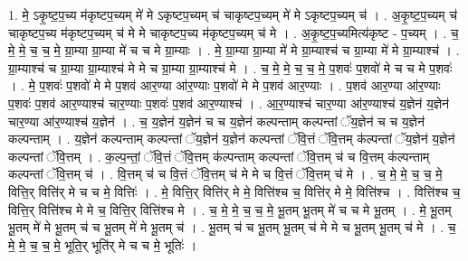 \documentclass[17pt]{extarticle}
\begin{document}
1. मे॒ ऽकृ॒ष्ट॒प॒च्य म॑कृष्टप॒च्यम् मे॑ मे ऽकृष्टप॒च्यम् च॑ चाकृष्टप॒च्यम् मे॑ मे ऽकृष्टप॒च्यम् च॑ । . अ॒कृ॒ष्ट॒प॒च्यम् च॑ चाकृष्टप॒च्य म॑कृष्टप॒च्यम् च॑ मे मे चाकृष्टप॒च्य म॑कृष्टप॒च्यम् च॑ मे । . अ॒कृ॒ष्ट॒प॒च्यमित्य॑कृष्ट - प॒च्यम् । . च॒ मे॒ मे॒ च॒ च॒ मे॒ ग्रा॒म्या ग्रा॒म्या मे॑ च च मे ग्रा॒म्याः । . मे॒ ग्रा॒म्या ग्रा॒म्या मे॑ मे ग्रा॒म्याश्च॑ च ग्रा॒म्या मे॑ मे ग्रा॒म्याश्च॑ । . ग्रा॒म्याश्च॑ च ग्रा॒म्या ग्रा॒म्याश्च॑ मे मे च ग्रा॒म्या ग्रा॒म्याश्च॑ मे । . च॒ मे॒ मे॒ च॒ च॒ मे॒ प॒शवः॑ प॒शवो॑ मे च च मे प॒शवः॑ । . मे॒ प॒शवः॑ प॒शवो॑ मे मे प॒शव॑ आर॒ण्या आ॑र॒ण्याः प॒शवो॑ मे मे प॒शव॑ आर॒ण्याः । . प॒शव॑ आर॒ण्या आ॑र॒ण्याः प॒शवः॑ प॒शव॑ आर॒ण्याश्च॑ चार॒ण्याः प॒शवः॑ प॒शव॑ आर॒ण्याश्च॑ । . आ॒र॒ण्याश्च॑ चार॒ण्या आ॑र॒ण्याश्च॑ य॒ज्ञेन॑ य॒ज्ञेन॑ चार॒ण्या आ॑र॒ण्याश्च॑ य॒ज्ञेन॑ । . च॒ य॒ज्ञेन॑ य॒ज्ञेन॑ च च य॒ज्ञेन॑ कल्पन्ताम् कल्पन्तां ॅय॒ज्ञेन॑ च च य॒ज्ञेन॑ कल्पन्ताम् । . य॒ज्ञेन॑ कल्पन्ताम् कल्पन्तां ॅय॒ज्ञेन॑ य॒ज्ञेन॑ कल्पन्तां ॅवि॒त्तं ॅवि॒त्तम् क॑ल्पन्तां ॅय॒ज्ञेन॑ य॒ज्ञेन॑ कल्पन्तां ॅवि॒त्तम् । . क॒ल्प॒न्तां॒ ॅवि॒त्तं ॅवि॒त्तम् क॑ल्पन्ताम् कल्पन्तां ॅवि॒त्तम् च॑ च वि॒त्तम् क॑ल्पन्ताम् कल्पन्तां ॅवि॒त्तम् च॑ । . वि॒त्तम् च॑ च वि॒त्तं ॅवि॒त्तम् च॑ मे मे च वि॒त्तं ॅवि॒त्तम् च॑ मे । . च॒ मे॒ मे॒ च॒ च॒ मे॒ वित्ति॒र् वित्ति॑र् मे च च मे॒ वित्तिः॑ । . मे॒ वित्ति॒र् वित्ति॑र् मे मे॒ वित्ति॑श्च च॒ वित्ति॑र् मे मे॒ वित्ति॑श्च । . वित्ति॑श्च च॒ वित्ति॒र् वित्ति॑श्च मे मे च॒ वित्ति॒र् वित्ति॑श्च मे । . च॒ मे॒ मे॒ च॒ च॒ मे॒ भू॒तम् भू॒तम् मे॑ च च मे भू॒तम् । . मे॒ भू॒तम् भू॒तम् मे॑ मे भू॒तम् च॑ च भू॒तम् मे॑ मे भू॒तम् च॑ । . भू॒तम् च॑ च भू॒तम् भू॒तम् च॑ मे मे च भू॒तम् भू॒तम् च॑ मे । . च॒ मे॒ मे॒ च॒ च॒ मे॒ भूति॒र् भूति॑र् मे च च मे॒ भूतिः॑ । \newline
\end{document}

